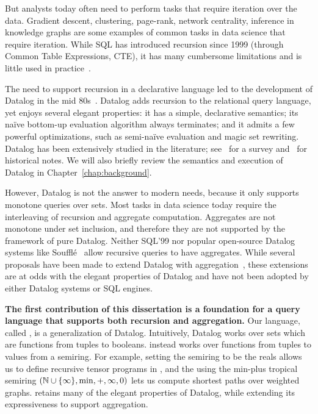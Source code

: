 But analysts today often need to perform tasks that require
iteration over the data.
Gradient descent, clustering, page-rank, network centrality, inference
in knowledge graphs are some examples of common tasks in data science
that require iteration.  While SQL has introduced recursion since 1999
(through Common Table Expressions, CTE), it has many cumbersome
limitations and is little used in practice~\cite{frankmcsherry-2022}.

The need to support recursion in a declarative language led to the
development of Datalog in the mid 80s~\cite{DBLP:conf/pods/Vianu21}.
Datalog adds recursion to the relational query language, yet enjoys several elegant
properties: it has a simple, declarative semantics; its na\"ive
bottom-up evaluation algorithm always terminates; and it admits a few
powerful optimizations, such as semi-na\"ive evaluation and magic set
rewriting.  Datalog has been extensively studied in the literature;
see~\cite{DBLP:journals/ftdb/GreenHLZ13} for a survey
and~\cite{DBLP:books/mc/18/MaierTKW18,DBLP:conf/pods/Vianu21} for historical notes.
We will also briefly review the semantics and execution of Datalog in
 Chapter~\ref{chap:background}.

However, Datalog is not the answer to modern needs, because it only
supports monotone queries over sets.  Most tasks in data science today
require the interleaving of recursion and aggregate computation.
Aggregates are not monotone under set inclusion, and therefore they
are not supported by the framework of pure Datalog.  Neither SQL'99
nor popular open-source Datalog systems like
Souffl\'e~\cite{DBLP:conf/cav/JordanSS16} allow recursive queries to
have aggregates.  While several proposals have been made to extend
Datalog with
aggregation~\cite{DBLP:conf/pods/GangulyGZ91,DBLP:conf/pods/RossS92,DBLP:journals/jcss/GangulyGZ95,DBLP:journals/vldb/MazuranSZ13,DBLP:conf/icde/ShkapskyYZ15,DBLP:conf/sigmod/ShkapskyYICCZ16,DBLP:conf/amw/ZanioloYDI16,DBLP:journals/tplp/ZanioloYDSCI17,DBLP:conf/amw/ZanioloYIDSC18,DBLP:journals/tplp/CondieDISYZ18,DBLP:conf/sigmod/0001WMSYDZ19,DBLP:journals/corr/abs-1910-08888,DBLP:journals/corr/abs-1909-08249,DBLP:journals/debu/ZanioloD0LL021},
these extensions are at odds with the elegant properties of Datalog
and have not been adopted by either Datalog systems or SQL engines.

\textbf{
The first contribution of this dissertation is a foundation for a query language that
supports both recursion and aggregation.}  
Our language, called \datalogo, is a generalization of Datalog. 
Intuitively, Datalog works over sets which are functions from tuples to booleans.
\datalogo instead works over functions from tuples to values from a semiring.
For example, setting the semiring to be the reals allows us to define recursive 
 tensor programs in \datalogo,
 and the using the min-plus tropical semiring $(\mathbb N \cup \{\infty\}, \min, +, \infty, 0)$
 lets us compute shortest paths over weighted graphs.
\datalogo retains many of the elegant properties of Datalog,
 while extending its expressiveness to support aggregation.

